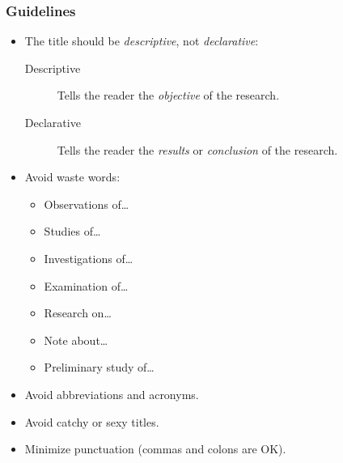 \documentclass[10pt,a4paper,twocolumn]{scrartcl}
\begin{document}
\subsubsection*{Guidelines}
\begin{itemize}
    \item The title should be \emph{descriptive}, not \emph{declarative}:
        \begin{description}
            \item[Descriptive] Tells the reader the \emph{objective} of the research.
            \item[Declarative] Tells the reader the \emph{results} or \emph{conclusion} of the research.
        \end{description}

    \item Avoid waste words:
        \begin{itemize}
            \item Observations of\dots
            \item Studies of\dots
            \item Investigations of\dots
            \item Examination of\dots
            \item Research on\dots
            \item Note about\dots
            \item Preliminary study of\dots
        \end{itemize}
    \item Avoid abbreviations and acronyms.
    \item Avoid catchy or sexy titles.
    \item Minimize punctuation (commas and colons are OK).
\end{itemize}
\end{document}
